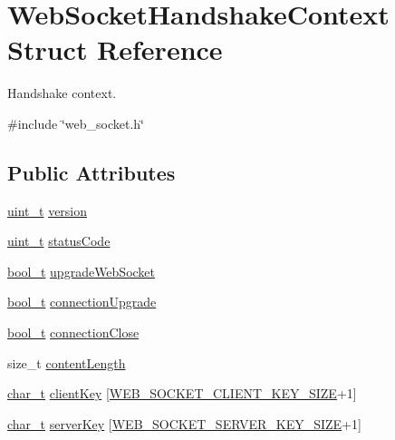 \hypertarget{structWebSocketHandshakeContext}{}\section{Web\+Socket\+Handshake\+Context Struct Reference}
\label{structWebSocketHandshakeContext}


Handshake context.  




{\ttfamily \#include \char`\"{}web\+\_\+socket.\+h\char`\"{}}

\subsection*{Public Attributes}
\begin{DoxyCompactItemize}
\item 
\hyperlink{compiler__port_8h_a12a1e9b3ce141648783a82445d02b58d}{uint\+\_\+t} \hyperlink{structWebSocketHandshakeContext_a9496aee1b2e4fcf092e06f99d2e4762d}{version}
\item 
\hyperlink{compiler__port_8h_a12a1e9b3ce141648783a82445d02b58d}{uint\+\_\+t} \hyperlink{structWebSocketHandshakeContext_a639b95639068873e12af0ad0638c140b}{status\+Code}
\item 
\hyperlink{compiler__port_8h_a812d16e5494522586b3784e55d479912}{bool\+\_\+t} \hyperlink{structWebSocketHandshakeContext_afcbf1dd5bbba5e6d6dd08868eadd5626}{upgrade\+Web\+Socket}
\item 
\hyperlink{compiler__port_8h_a812d16e5494522586b3784e55d479912}{bool\+\_\+t} \hyperlink{structWebSocketHandshakeContext_adc97c9e21e2aef9c5e743e612ea13bab}{connection\+Upgrade}
\item 
\hyperlink{compiler__port_8h_a812d16e5494522586b3784e55d479912}{bool\+\_\+t} \hyperlink{structWebSocketHandshakeContext_a8c383331ffc1e0584d723720abeffcdd}{connection\+Close}
\item 
size\+\_\+t \hyperlink{structWebSocketHandshakeContext_a7caaa4546b22dbfdc5bbcca9f3e76c09}{content\+Length}
\item 
\hyperlink{compiler__port_8h_a40bb5262bf908c328fbcfbe5d29d0201}{char\+\_\+t} \hyperlink{structWebSocketHandshakeContext_af28fef00979612ccfed3ab93d5da1b38}{client\+Key} \mbox{[}\hyperlink{web__socket_8h_aec52a37b246082418c0b6dbf0235e99d}{W\+E\+B\+\_\+\+S\+O\+C\+K\+E\+T\+\_\+\+C\+L\+I\+E\+N\+T\+\_\+\+K\+E\+Y\+\_\+\+S\+I\+ZE}+1\mbox{]}
\item 
\hyperlink{compiler__port_8h_a40bb5262bf908c328fbcfbe5d29d0201}{char\+\_\+t} \hyperlink{structWebSocketHandshakeContext_a5539a48778d86216622299eb3f76380b}{server\+Key} \mbox{[}\hyperlink{web__socket_8h_ab90bffcb2db9573de4a19252616df227}{W\+E\+B\+\_\+\+S\+O\+C\+K\+E\+T\+\_\+\+S\+E\+R\+V\+E\+R\+\_\+\+K\+E\+Y\+\_\+\+S\+I\+ZE}+1\mbox{]}

\end{DoxyCompactItemize}
